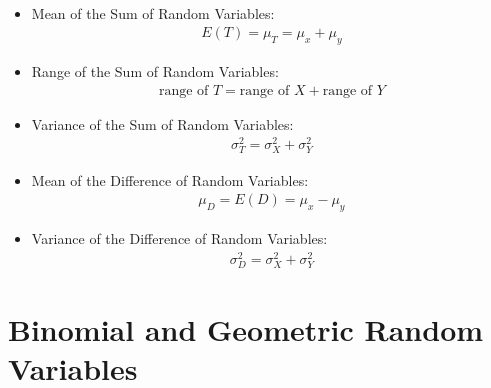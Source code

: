 \documentclass[Main.tex]{subfiles}
\begin{document}
	\begin{exercise} \hfill \\
		\begin{itemize}	
			\item Mean of the Sum of Random Variables:
			\begin{subequations}
				\begin{align}
				E(T)=\mu_{T}=\mu_{x}+\mu_{y}
				\end{align}
			\end{subequations}\hfill			
			\item Range of the Sum of Random Variables:
			\begin{subequations}
				\begin{align}
				\text{range of $T$}=\text{range of $X$}+\text{range of $Y$}
				\end{align}
			\end{subequations}\hfill
			\item Variance of the Sum of Random Variables:
			\begin{subequations}
				\begin{align}
				\sigma^{2}_{T}=\sigma^{2}_{X}+\sigma^{2}_{Y}
				\end{align}
			\end{subequations}\hfill
			\item Mean of the Difference of Random Variables:
			\begin{subequations}
				\begin{align}
				\mu_{D}=E(D)=\mu_{x}-\mu_{y}
				\end{align}
			\end{subequations}\hfill
			\item Variance of the Difference of Random Variables:
			\begin{subequations}
				\begin{align}
				\sigma^{2}_{D}=\sigma^{2}_{X}+\sigma^{2}_{Y}
				\end{align}
			\end{subequations}\hfill						
		\end{itemize}
	\end{exercise}	
							
	
	\section{Binomial and Geometric Random Variables}
	
\end{document}
